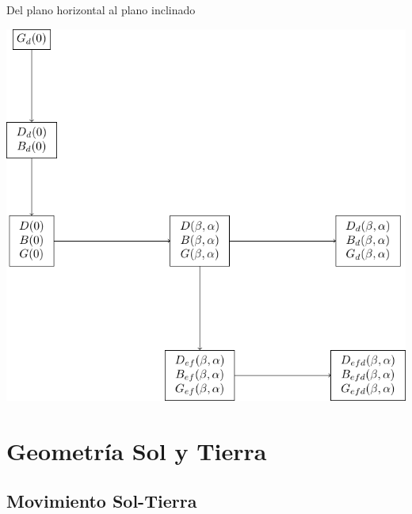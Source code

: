 \documentclass[xcolor={usenames,svgnames,dvipsnames}]{beamer}
\begin{document}
\begin{frame}[label={sec:org01836b7}]{Del plano horizontal al plano inclinado}
\begin{center}
\includegraphics[width=.9\linewidth]{../figs/ProcedimientoCalculoRadiacionInclinada.pdf}
\end{center}
\end{frame}

\section{Geometría Sol y Tierra}
\label{sec:org5f40095}
\subsection{Movimiento Sol-Tierra}
\label{sec:org3f89562}
\end{document}
